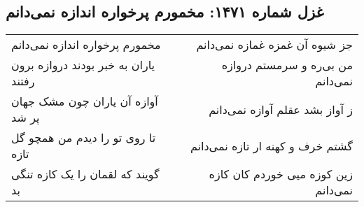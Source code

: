 \begin{center}
\section*{غزل شماره ۱۴۷۱: مخمورم پرخواره اندازه نمی‌دانم}
\label{sec:1471}
\begin{longtable}{l p{0.5cm} r}
مخمورم پرخواره اندازه نمی‌دانم
&&
جز شیوه آن غمزه غمازه نمی‌دانم
\\
یاران به خبر بودند دروازه برون رفتند
&&
من بی‌ره و سرمستم دروازه نمی‌دانم
\\
آوازه آن یاران چون مشک جهان پر شد
&&
ز آواز بشد عقلم آوازه نمی‌دانم
\\
تا روی تو را دیدم من همچو گل تازه
&&
گشتم خرف و کهنه ار تازه نمی‌دانم
\\
گویند که لقمان را یک کازه تنگی بد
&&
زین کوزه میی خوردم کان کازه نمی‌دانم
\\
\end{longtable}
\end{center}
